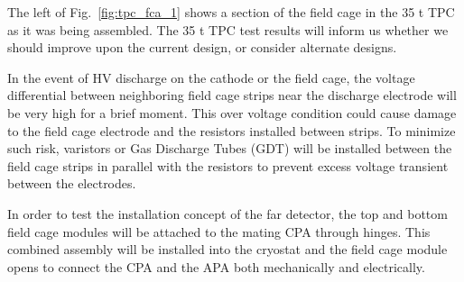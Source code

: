 The left of Fig.~\ref{fig:tpc_fca_1} shows a section of the field cage in the 35 t TPC as it was being assembled.  The 35 t TPC test results will inform us whether we should improve upon the current design, or consider alternate designs.

In the event of HV discharge on the cathode or the field cage, the voltage differential between neighboring field cage strips near the discharge electrode will be very high for a brief moment.  This over voltage condition could cause damage to the field cage electrode and the resistors installed between strips.  To minimize such risk, varistors or Gas Discharge Tubes (GDT) will be installed between the field cage strips in parallel with the resistors to prevent excess voltage transient between the electrodes. 

In order to test the installation concept of the far detector, the top and bottom field cage modules will be attached to the mating CPA through hinges.  This combined assembly will be installed into the cryostat and the field cage module opens to connect the CPA and the APA both mechanically and electrically. 







